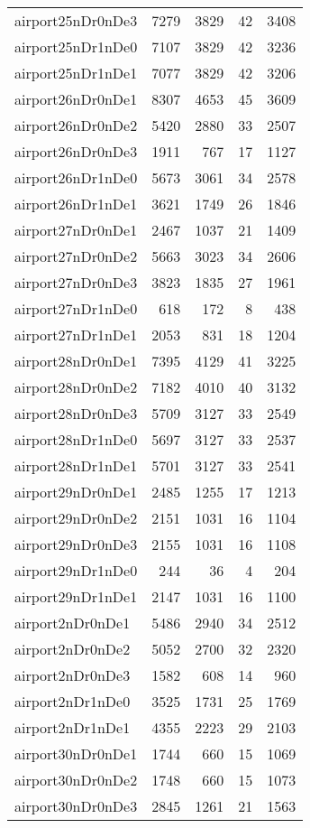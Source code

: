 \begin{longtable}{lrrrr}
airport25nDr0nDe3 & 7279 & 3829 & 42 & 3408 \\
airport25nDr1nDe0 & 7107 & 3829 & 42 & 3236 \\
airport25nDr1nDe1 & 7077 & 3829 & 42 & 3206 \\
airport26nDr0nDe1 & 8307 & 4653 & 45 & 3609 \\
airport26nDr0nDe2 & 5420 & 2880 & 33 & 2507 \\
airport26nDr0nDe3 & 1911 & 767 & 17 & 1127 \\
airport26nDr1nDe0 & 5673 & 3061 & 34 & 2578 \\
airport26nDr1nDe1 & 3621 & 1749 & 26 & 1846 \\
airport27nDr0nDe1 & 2467 & 1037 & 21 & 1409 \\
airport27nDr0nDe2 & 5663 & 3023 & 34 & 2606 \\
airport27nDr0nDe3 & 3823 & 1835 & 27 & 1961 \\
airport27nDr1nDe0 & 618 & 172 & 8 & 438 \\
airport27nDr1nDe1 & 2053 & 831 & 18 & 1204 \\
airport28nDr0nDe1 & 7395 & 4129 & 41 & 3225 \\
airport28nDr0nDe2 & 7182 & 4010 & 40 & 3132 \\
airport28nDr0nDe3 & 5709 & 3127 & 33 & 2549 \\
airport28nDr1nDe0 & 5697 & 3127 & 33 & 2537 \\
airport28nDr1nDe1 & 5701 & 3127 & 33 & 2541 \\
airport29nDr0nDe1 & 2485 & 1255 & 17 & 1213 \\
airport29nDr0nDe2 & 2151 & 1031 & 16 & 1104 \\
airport29nDr0nDe3 & 2155 & 1031 & 16 & 1108 \\
airport29nDr1nDe0 & 244 & 36 & 4 & 204 \\
airport29nDr1nDe1 & 2147 & 1031 & 16 & 1100 \\
airport2nDr0nDe1 & 5486 & 2940 & 34 & 2512 \\
airport2nDr0nDe2 & 5052 & 2700 & 32 & 2320 \\
airport2nDr0nDe3 & 1582 & 608 & 14 & 960 \\
airport2nDr1nDe0 & 3525 & 1731 & 25 & 1769 \\
airport2nDr1nDe1 & 4355 & 2223 & 29 & 2103 \\
airport30nDr0nDe1 & 1744 & 660 & 15 & 1069 \\
airport30nDr0nDe2 & 1748 & 660 & 15 & 1073 \\
airport30nDr0nDe3 & 2845 & 1261 & 21 & 1563 \\

\end{longtable}
